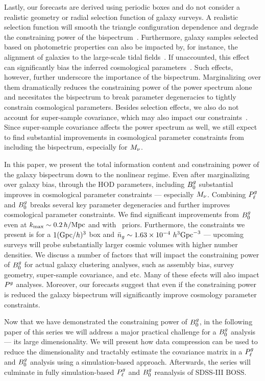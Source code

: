 Lastly, our forecasts are derived using periodic boxes and do not consider a
realistic geometry or radial selection function of galaxy surveys. A realistic 
selection function will smooth the triangle configuration dependence and degrade 
the constraining power of the bispectrum~\citep{sefusatti2005}. Furthermore, galaxy 
samples selected based on photometric properties can also be impacted by, for instance, 
the alignment of galaxies to the large-scale tidal fields~\citep{hirata2009,
krause2011, martens2018, obuljen2019}. If unaccounted, this effect can
significantly bias the inferred cosmological parameters~\citep{agarwal2020}. 
Such effects, however, further underscore the importance of the bispectrum.
Marginalizing over them dramatically reduces the constraining power of the
power spectrum alone and necesitates the bispectrum to break parameter
degeneracies to tightly constrain cosmological parameters. Besides selection
effects, we also do not account for super-sample covariance, which may also impact 
our constraints~\citep{hamilton2006, sefusatti2006, takada2013, li2018,
wadekar2019}. Since super-sample covariance affects the power spectrum as well, 
we still expect to find substantial improvements in cosmological parameter 
constraints from including the bispectrum, especially for $M_\nu$. 

In this paper, we present the total information content and constraining power
of the galaxy bispectrum down to the nonlinear regime. Even after marginalizing
over galaxy bias, through the HOD parameters, including $B^g_0$ substantial
improves in cosmological parameter constraints --- especially $M_\nu$.
Combining $P^g_{\ell}$ and $B^g_0$ breaks several key parameter degeneracies
and further improves cosmological parameter constraints. We find significant
improvements from $B^g_0$ even at $k_{\rm max} \sim 0.2\,h/\mathrm{Mpc}$ and with \planck~priors. 
Furthermore, the constraints we present is for a $1 ({\rm Gpc}/h)^3$
box and $\bar{n}_g \sim 1.63\times 10^{-4}~h^3{\rm Gpc}^{-3}$ --- upcoming surveys
will probe substantially larger cosmic volumes with higher number densities.
We discuss a number of factors that will impact the constraining power of $B^g_0$
for actual galaxy clustering analyses, such as assembly bias, survey geometry,
super-sample covariance, and etc. Many of these efects will also impact $P^g$
analyses. Moreover, our forecasts suggest that even if the constraining power 
is reduced the galaxy bispectrum will significantly improve cosmology parameter 
constraints.

Now that we have demonstrated the constraining power of $B^g_0$, in the following 
paper of this series we will address a major practical challenge for a $B^g_0$
analysis --- its large dimensionality. We will present how data compression can
be used to reduce the dimensionality and tractably estimate the covariance
matrix in a $P^g_{\ell}$ and $B^g_0$ analysis using a simulation-based approach. Afterwards, 
the series will culminate in fully simulation-based $P^g_{\ell}$ and $B^g_0$
reanalysis of SDSS-III BOSS. 

